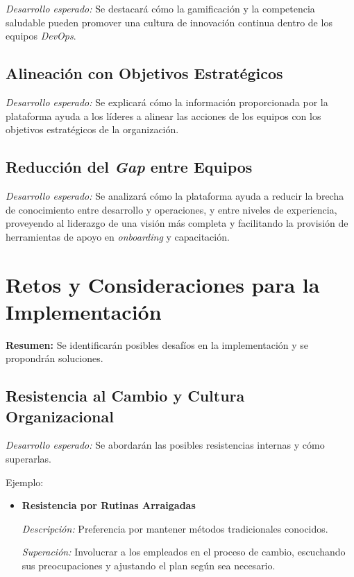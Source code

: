 \documentclass[journal]{IEEEtran}
\begin{document}
\textit{Desarrollo esperado:} Se destacará cómo la gamificación y la competencia saludable pueden promover una cultura de innovación continua dentro de los equipos \textit{DevOps}.

\subsection{\textbf{Alineación con Objetivos Estratégicos}}

\textit{Desarrollo esperado:} Se explicará cómo la información proporcionada por la plataforma ayuda a los líderes a alinear las acciones de los equipos con los objetivos estratégicos de la organización.

\subsection{\textbf{Reducción del \textit{Gap} entre Equipos}}

\textit{Desarrollo esperado:} Se analizará cómo la plataforma ayuda a reducir la brecha de conocimiento entre desarrollo y operaciones, y entre niveles de experiencia, proveyendo al liderazgo de una visión más completa y facilitando la provisión de herramientas de apoyo en \textit{onboarding} y capacitación.

\section{\textbf{\Large Retos y Consideraciones para la Implementación}}

\textbf{Resumen:} Se identificarán posibles desafíos en la implementación y se propondrán soluciones.

\subsection{\textbf{Resistencia al Cambio y Cultura Organizacional}}

\textit{Desarrollo esperado:} Se abordarán las posibles resistencias internas y cómo superarlas.

Ejemplo:

\begin{itemize}
    \item \textbf{Resistencia por Rutinas Arraigadas}
    
    \textit{Descripción:} Preferencia por mantener métodos tradicionales conocidos.
    
    \textit{Superación:} Involucrar a los empleados en el proceso de cambio, escuchando sus preocupaciones y ajustando el plan según sea necesario.
\end{itemize}
\end{document}
